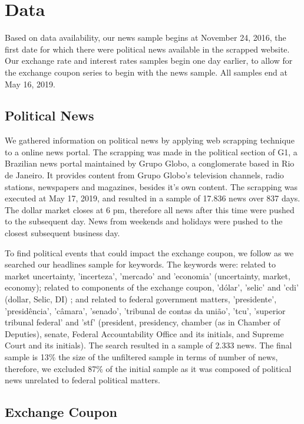 \documentclass[cic,tc, english]{iiufrgs}
\begin{document}
\section{Data} \label{chapter_data}

    Based on data availability, our news sample begins at November 24, 2016, the first date for which there were political news available in the scrapped website. Our exchange rate and interest rates samples begin one day earlier, to allow for the exchange coupon series to begin with the news sample. All samples end at May 16, 2019.

\subsection{Political News} \label{chapter_political_news}
    
    We gathered information on political news by applying web scrapping technique to a online news portal. The scrapping was made in the political section of G1, a Brazilian news portal maintained by Grupo Globo, a conglomerate based in Rio de Janeiro. It provides content from Grupo Globo's television channels, radio stations, newspapers and magazines, besides it's own content. The scrapping was executed at May 17, 2019, and resulted in a sample of 17.836 news over 837 days. The dollar market closes at 6 pm, therefore all news after this time were pushed to the subsequent day. News from weekends and holidays were pushed to the closest subsequent business day.

    To find political events that could impact the exchange coupon, we follow \citet{bbb} as we searched our headlines sample for keywords. The keywords were: related to market uncertainty, 'incerteza', 'mercado' and 'economia' (uncertainty, market, economy); related to components of the exchange coupon, 'dólar', 'selic' and 'cdi' (dollar, Selic, DI) ; and related to federal government matters, 'presidente', 'presidência', 'câmara', 'senado', 'tribunal de contas da união', 'tcu', 'superior tribunal federal' and 'stf' (president, presidency, chamber (as in Chamber of Deputies), senate, Federal Accountability Office and its initials, and Supreme Court and its initials). The search resulted in a sample of 2.333 news. The final sample is 13\% the size of the unfiltered sample in terms of number of news, therefore, we excluded 87\% of the initial sample as it was composed of political news unrelated to federal political matters.

\subsection{Exchange Coupon} \label{chapter_exchange_coupon}
\end{document}
